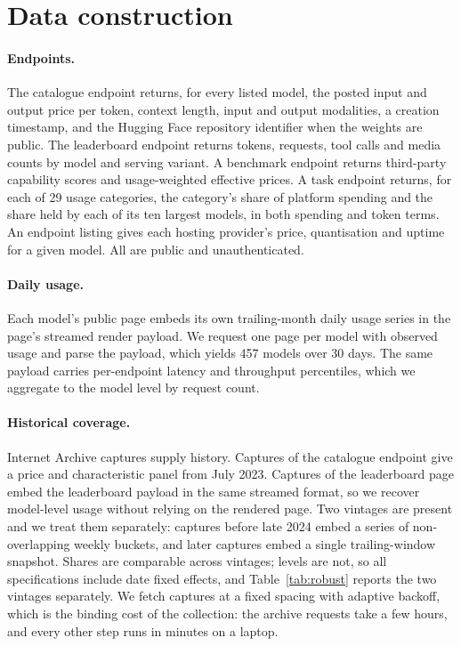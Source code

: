 \documentclass{article}
\newcommand{\Nactive}{457}
\newcommand{\Ntasks}{29}
\begin{document}
\appendix
\setcounter{topnumber}{2}
\setcounter{totalnumber}{3}
\setcounter{bottomnumber}{1}

\section{Data construction}
\label{app:data}

\paragraph{Endpoints.} The catalogue endpoint returns, for every listed model, the posted
input and output price per token, context length, input and output modalities, a creation
timestamp, and the Hugging Face repository identifier when the weights are public. The
leaderboard endpoint returns tokens, requests, tool calls and media counts by model and
serving variant. A benchmark endpoint returns third-party capability scores and
usage-weighted effective prices. A task endpoint returns, for each of \Ntasks{} usage
categories, the category's share of platform spending and the share held by each of its
ten largest models, in both spending and token terms. An endpoint listing gives each
hosting provider's price, quantisation and uptime for a given model. All are public and
unauthenticated.

\paragraph{Daily usage.} Each model's public page embeds its own trailing-month daily usage
series in the page's streamed render payload. We request one page per model with observed
usage and parse the payload, which yields \Nactive{} models over 30 days. The same payload
carries per-endpoint latency and throughput percentiles, which we aggregate to the model
level by request count.

\paragraph{Historical coverage.} Internet Archive captures supply history. Captures of the
catalogue endpoint give a price and characteristic panel from July 2023. Captures of the
leaderboard page embed the leaderboard payload in the same streamed format, so we recover
model-level usage without relying on the rendered page. Two vintages are present and we
treat them separately: captures before late 2024 embed a series of non-overlapping weekly
buckets, and later captures embed a single trailing-window snapshot. Shares are comparable
across vintages; levels are not, so all specifications include date fixed effects, and
Table~\ref{tab:robust} reports the two vintages separately. We fetch captures at a fixed
spacing with adaptive backoff, which is the binding cost of the collection: the archive
requests take a few hours, and every other step runs in minutes on a laptop.
\end{document}
